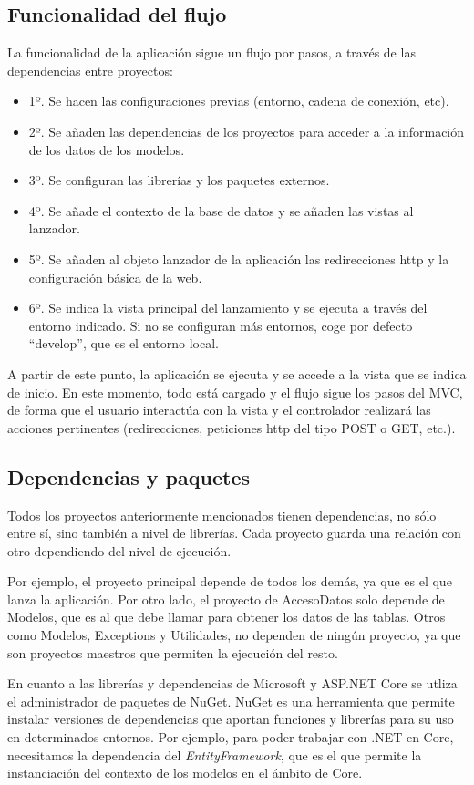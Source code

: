 \subsection{Funcionalidad del flujo}
La funcionalidad de la aplicación sigue un flujo por pasos, a través de las dependencias entre proyectos:
\begin{itemize}
    \item 1º. Se hacen las configuraciones previas (entorno, cadena de conexión, etc).
    \item 2º. Se añaden las dependencias de los proyectos para acceder a la información de los datos de los modelos.
    \item 3º. Se configuran las librerías y los paquetes externos.
    \item 4º. Se añade el contexto de la base de datos y se añaden las vistas al lanzador.
    \item 5º. Se añaden al objeto lanzador de la aplicación las redirecciones http y la configuración básica de la web.
    \item 6º. Se indica la vista principal del lanzamiento y se ejecuta a través del entorno indicado. Si no se configuran más entornos, coge por defecto ``develop'', que es el entorno
    local.
\end{itemize}

A partir de este punto, la aplicación se ejecuta y se accede a la vista que se indica de inicio. En este momento, todo está cargado y el flujo sigue los pasos del MVC, de forma que el usuario interactúa con la vista y el controlador realizará las acciones pertinentes (redirecciones, peticiones http del tipo POST o GET, etc.).

\subsection{Dependencias y paquetes}
Todos los proyectos anteriormente mencionados tienen dependencias, no sólo entre sí, sino también a nivel de librerías. Cada proyecto guarda una relación con otro dependiendo del nivel de ejecución.

Por ejemplo, el proyecto principal depende de todos los demás, ya que es el que lanza la aplicación. Por otro lado, el proyecto de AccesoDatos solo depende de Modelos, que es al que debe llamar para obtener los datos de las tablas. Otros como Modelos, Exceptions y Utilidades, no dependen de ningún proyecto, ya que son proyectos maestros que permiten la ejecución del resto.

En cuanto a las librerías y dependencias de Microsoft y ASP.NET Core se utliza el administrador de paquetes de NuGet. NuGet es una herramienta que permite instalar versiones de dependencias que aportan funciones y librerías para su uso en determinados entornos. Por ejemplo, para poder trabajar con .NET en Core, necesitamos la dependencia del \emph{EntityFramework}, que es el que permite la instanciación del contexto de los modelos en el ámbito de Core.

